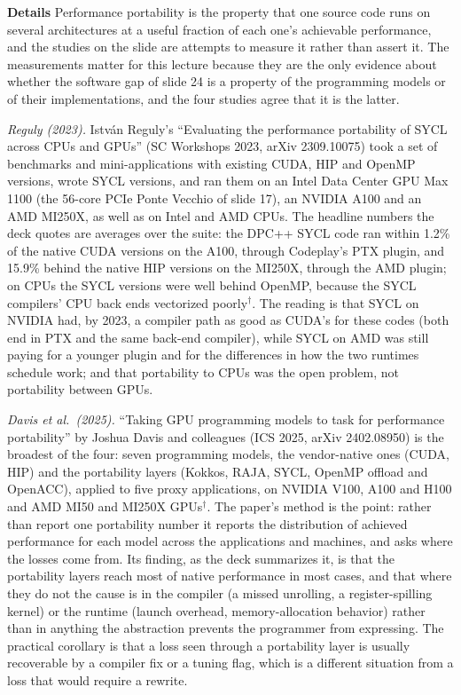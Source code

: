 \documentclass[11pt,letterpaper]{article}
\newcommand{\para}[1]{\medskip\noindent\textbf{#1}\quad}
\begin{document}
\para{Details} Performance portability is the property that one source code runs on several architectures at a useful fraction of each one's achievable performance, and the studies on the slide are attempts to measure it rather than assert it. The measurements matter for this lecture because they are the only evidence about whether the software gap of slide 24 is a property of the programming models or of their implementations, and the four studies agree that it is the latter.

\emph{Reguly (2023).} István Reguly's ``Evaluating the performance portability of SYCL across CPUs and GPUs'' (SC Workshops 2023, arXiv 2309.10075) took a set of benchmarks and mini-applications with existing CUDA, HIP and OpenMP versions, wrote SYCL versions, and ran them on an Intel Data Center GPU Max 1100 (the 56-core PCIe Ponte Vecchio of slide 17), an NVIDIA A100 and an AMD MI250X, as well as on Intel and AMD CPUs. The headline numbers the deck quotes are averages over the suite: the DPC++ SYCL code ran within 1.2\% of the native CUDA versions on the A100, through Codeplay's PTX plugin, and 15.9\% behind the native HIP versions on the MI250X, through the AMD plugin; on CPUs the SYCL versions were well behind OpenMP, because the SYCL compilers' CPU back ends vectorized poorly$^\dagger$. The reading is that SYCL on NVIDIA had, by 2023, a compiler path as good as CUDA's for these codes (both end in PTX and the same back-end compiler), while SYCL on AMD was still paying for a younger plugin and for the differences in how the two runtimes schedule work; and that portability to CPUs was the open problem, not portability between GPUs.

\emph{Davis et al.\ (2025).} ``Taking GPU programming models to task for performance portability'' by Joshua Davis and colleagues (ICS 2025, arXiv 2402.08950) is the broadest of the four: seven programming models, the vendor-native ones (CUDA, HIP) and the portability layers (Kokkos, RAJA, SYCL, OpenMP offload and OpenACC), applied to five proxy applications, on NVIDIA V100, A100 and H100 and AMD MI50 and MI250X GPUs$^\dagger$. The paper's method is the point: rather than report one portability number it reports the distribution of achieved performance for each model across the applications and machines, and asks where the losses come from. Its finding, as the deck summarizes it, is that the portability layers reach most of native performance in most cases, and that where they do not the cause is in the compiler (a missed unrolling, a register-spilling kernel) or the runtime (launch overhead, memory-allocation behavior) rather than in anything the abstraction prevents the programmer from expressing. The practical corollary is that a loss seen through a portability layer is usually recoverable by a compiler fix or a tuning flag, which is a different situation from a loss that would require a rewrite.
\end{document}
